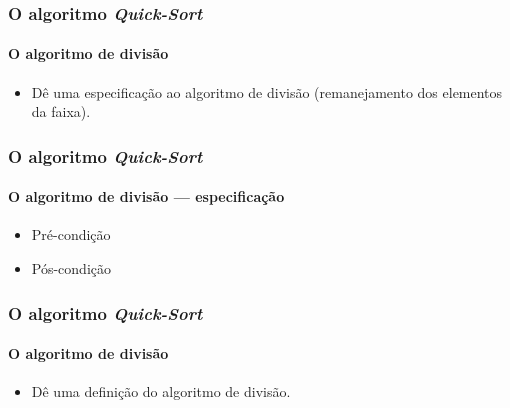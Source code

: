 \documentclass{beamer}
\begin{document}
\begin{frame}

  \frametitle{O algoritmo \textit{Quick-Sort}}
  \framesubtitle{O algoritmo de divisão}

  \begin{itemize}
  \item Dê uma especificação ao algoritmo de divisão (remanejamento dos
    elementos da faixa).
  \end{itemize}
\end{frame}

\begin{frame}

  \frametitle{O algoritmo \textit{Quick-Sort}}
  \framesubtitle{O algoritmo de divisão --- especificação}

  \begin{itemize}
  \item Pré-condição
    \pause
  \item Pós-condição
  \end{itemize}

\end{frame}

\begin{frame}

  \frametitle{O algoritmo \textit{Quick-Sort}}
  \framesubtitle{O algoritmo de divisão}

  \begin{itemize}
  \item Dê uma definição do algoritmo de divisão.
  \end{itemize}
\end{frame}
\end{document}
